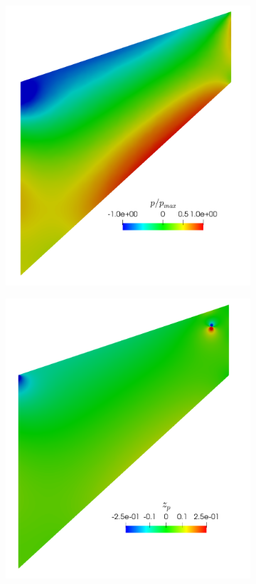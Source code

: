 \begin{figure}[ht!]
\centering
\begin{subfigure}{.33\textwidth}
\centering
\includegraphics[width=.99\linewidth]{img/mech_cooks_pw_p.png}
\end{subfigure}%
\begin{subfigure}{.33\textwidth}
\centering
\includegraphics[width=.99\linewidth]{img/mech_cooks_pw_zp.png}

\end{subfigure}
\end{figure}
